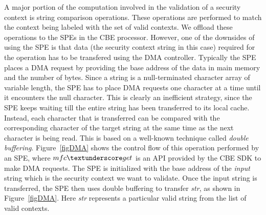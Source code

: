 \documentclass[conference]{IEEEtran}
\begin{document}
A major portion of the computation involved in the validation of a
security context is string comparison operations.  These operations
are performed to match the context being labeled with the set of valid
contexts.  We offload these operations to the SPEs in the CBE
processor.  However, one of the downsides of using the SPE is that
data (the security context string in this case) required for the
operation has to be transfered using the DMA controller.  Typically
the SPE places a DMA request by providing the base address of the data
in main memory and the number of bytes.  Since a string is a
null-terminated character array of variable length, the SPE has to
place DMA requests one character at a time until it encounters the
null character.  This is clearly an inefficient strategy, since the
SPE keeps waiting till the entire string has been transferred to its
local cache.  Instead, each character that is transferred can be
compared with the corresponding character of the target string at the
same time as the next character is being read.  This is based on a
well-known technique called \emph{double buffering}.
Figure~\ref{figDMA} shows the control flow of this operation performed
by an SPE, where $mfc\textunderscore get$ is an API provided by the
CBE SDK to make DMA requests. The SPE is initialized with the base
address of the \emph{input} string which is the security context we
want to validate. Once the input string is transferred, the SPE then
uses double buffering to transfer \emph{str}, as shown in
Figure~\ref{figDMA}.  Here \emph{str} represents a particular valid
string from the list of valid contexts.
\end{document}

